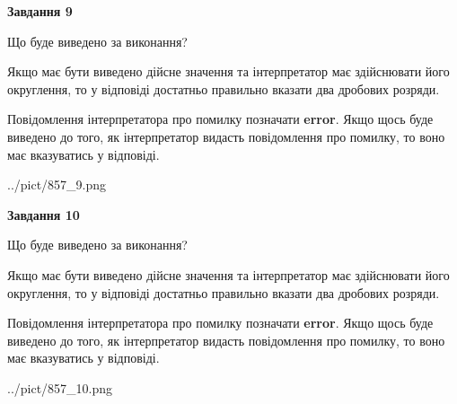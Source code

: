 \documentclass[12pt, ukrainian]{article}
\begin{document}
{\begin {Large}
{\begin {center}\textbf{Завдання 9}\end {center}}\par
Що буде виведено за виконання? \par

Якщо має бути виведено дійсне значення та інтерпретатор має здійснювати його округлення, 
то у відповіді достатньо правильно вказати два дробових розряди.

Повідомлення інтерпретатора про помилку позначати \textbf{error}.
Якщо щось буде виведено до того, як інтерпретатор видасть повідомлення про помилку, 
то воно має вказуватись у відповіді. \par

\begin{center}
	{../pict/857_9.png}
\end{center}
\newpage

{\begin {center}\textbf{Завдання 10}\end {center}}\par
Що буде виведено за виконання? \par

Якщо має бути виведено дійсне значення та інтерпретатор має здійснювати його округлення, 
то у відповіді достатньо правильно вказати два дробових розряди.

Повідомлення інтерпретатора про помилку позначати \textbf{error}.
Якщо щось буде виведено до того, як інтерпретатор видасть повідомлення про помилку, 
то воно має вказуватись у відповіді. \par

\begin{center}
	{../pict/857_10.png}
\end{center}
\newpage

\end {Large}}
\end{document}
